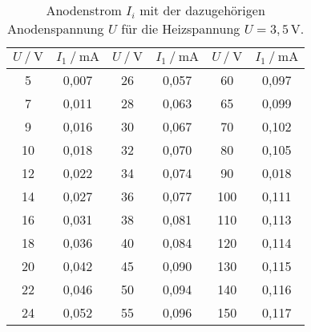 \begin{table}[H]
    \centering
    \caption{Anodenstrom $I_i$ mit der dazugehörigen Anodenspannung $U$ für die Heizspannung $U = 3,5 \, \unit{\volt} $.}
    \label{tab:kennlini1_2}
    \begin{tabular}{S S S S S[table-format=3.1] S}
      \toprule
      {$U \mathbin{/} \unit{\volt}$} & {$I_1 \mathbin{/} \unit{\milli\ampere}$} & {$U \mathbin{/} \unit{\volt}$} & {$I_1 \mathbin{/} \unit{\milli\ampere}$} & {$U \mathbin{/} \unit{\volt}$} & {$I_1 \mathbin{/} \unit{\milli\ampere}$}  \\
      \midrule
            {5}&       {0,007}&        {26}&      {0,057}&        {60}&      {0,097}\\
            {7}&       {0,011}&        {28}&      {0,063}&        {65}&      {0,099}\\
            {9}&       {0,016}&        {30}&      {0,067}&        {70}&      {0,102}\\
            {10}&      {0,018}&        {32}&      {0,070}&        {80}&      {0,105}\\
            {12}&      {0,022}&        {34}&      {0,074}&        {90}&      {0,018}\\
            {14}&      {0,027}&        {36}&      {0,077}&        {100}&     {0,111}\\
            {16}&      {0,031}&        {38}&      {0,081}&        {110}&     {0,113}\\
            {18}&      {0,036}&        {40}&      {0,084}&        {120}&     {0,114}\\
            {20}&      {0,042}&        {45}&      {0,090}&        {130}&     {0,115}\\
            {22}&      {0,046}&        {50}&      {0,094}&        {140}&     {0,116}\\
            {24}&      {0,052}&        {55}&      {0,096}&        {150}&     {0,117}\\

      \bottomrule
    \end{tabular}
\end{table}

